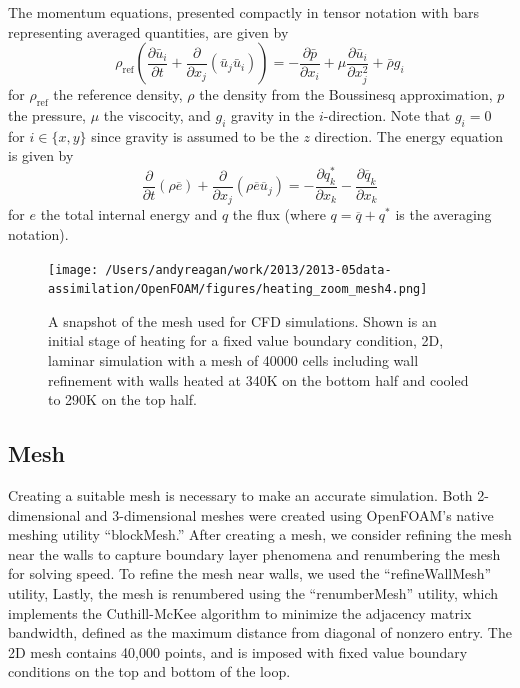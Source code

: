 \documentclass[12pt]{report}
\begin{document}
The momentum equations, presented compactly in tensor notation with bars representing averaged quantities, are given by
\begin{equation} \rho_\text{ref} \left ( \frac{\partial \bar{u}_i}{\partial t} + \frac{\partial}{\partial x_j} \left( \bar{u}_j \bar{u}_i \right) \right )
= -\frac{\partial \bar{p}} {\partial{x_i}} +  \mu \frac{\partial \bar{u}_i}{\partial x_j^2} + \bar{\rho} g_i \end{equation}
for $\rho_\text{ref}$ the reference density, $\rho$ the density from the Boussinesq approximation, $p$ the pressure, $\mu$ the viscocity, and $g_i$ gravity in the $i$-direction.
Note that $g_i = 0$ for $i \in \{ x,y\}$ since gravity is assumed to be the $z$ direction.
The energy equation is given by
\begin{equation} \frac{\partial }{\partial t} \left ( \rho \overline{e}\right ) + \frac{\partial}{\partial x_j} \left ( \rho \overline{e} \overline{u}_j \right ) 
= 
- \frac{\partial q_k^*}{\partial x_k}
- \frac{\partial \overline{q}_k}{\partial x_k}
\end{equation}
for $e$ the total internal energy and $q$ the flux (where $q = \overline{q} + q^*$ is the averaging notation).

\begin{figure}[t!]
  \centering
  \texttt{[image: /Users/andyreagan/work/2013/2013-05data-assimilation/OpenFOAM/figures/heating\_zoom\_mesh4.png]}
  \caption[A snapshot of the mesh used for CFD simulations]{
  A snapshot of the mesh used for CFD simulations.
  Shown is an initial stage of heating for a fixed value boundary condition, 2D, laminar simulation with a mesh of 40000 cells including wall refinement with walls heated at 340K on the bottom half and cooled to 290K on the top half.
  }
  \label{fig:CFDmesh1}
\end{figure}

\subsection{Mesh}

Creating a suitable mesh is necessary to make an accurate simulation.
Both 2-dimensional and 3-dimensional meshes were created using OpenFOAM's native meshing utility ``blockMesh.''
After creating a mesh, we consider refining the mesh near the walls to capture boundary layer phenomena and renumbering the mesh for solving speed.
To refine the mesh near walls, we used the ``refineWallMesh'' utility, 
Lastly, the mesh is renumbered using the ``renumberMesh'' utility, which implements the Cuthill-McKee algorithm to minimize the adjacency matrix bandwidth, defined as the maximum distance from diagonal of nonzero entry.
The 2D mesh contains 40,000 points, and is imposed with fixed value boundary conditions on the top and bottom of the loop.
\end{document}
